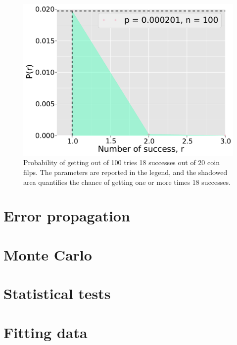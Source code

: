 \documentclass[twocolumn,10]{article}
\begin{document}
	\begin{figure}[h]
		\begin{center}
			\includegraphics[width=.4\textwidth]{fig/lil_2.pdf}
		\end{center}
		\caption{Probability of getting out of 100 tries 18 successes out of 20 coin filps. The parameters are reported in the legend, and the shadowed area quantifies the chance of getting one or more times 18 successes.}
		\label{fig:lil2}
	\end{figure}
\section{Error propagation} %
\label{sec:error_propagation}
\subsection{}

\section{Monte Carlo} %
\label{sec:monte_carlo}


\section{Statistical tests} %
\label{sec:statistical_tests}



\section{Fitting data} %
\label{sec:fitting_data}

\end{document}
